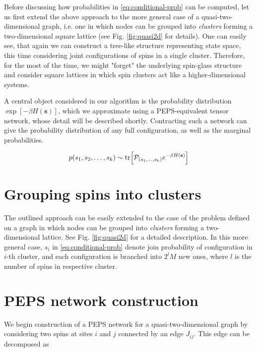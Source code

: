 Before discussing how probabilities in \eqref{eq:conditional-prob} can be computed, let us first extend the above approach to the more general case of a quasi-two-dimensional graph, i.e. one in which nodes can be grouped into \emph{clusters} forming a two-dimensional square lattice (see Fig. \ref{fig:quasi2d} for details). One can easily see, that again we can construct a tree-like structure representing state space, this time considering joint configurations of spins in a single cluster. Therefore, for the most of the time, we might "forget" the underlying spin-glass structure and consider square lattices in which spin clusters act like a higher-dimensional systems.

A central object considered in our algorithm is the probability distribution $\exp[-\beta H(\mathbf{s})]$, which we approximate using a PEPS-equivalent tensor network, whose detail will be described shortly. Contracting such a network can give the probability distribution of any full configuration, as well as the marginal probabilities.

\begin{equation}
    p(s_1, s_2, \ldots, s_k) \sim \tr[\mathcal{P}_{(s_1, \ldots, s_k)} e^{-\beta H(\mathbf{s})}]
\end{equation}

\section{Grouping spins into clusters}
The outlined approach can be easily extended to the case of the problem defined on a graph in which nodes can be grouped into \emph{clusters} forming a two-dimensional lattice. See Fig. \ref{fig:quasi2d} for a detailed description. In this more general case, $s_i$ in \eqref{eq:conditional-prob} denote join probability of configuration in $i$-th cluster, and each configuration is branched into $2^lM$ new ones, where $l$ is the number of spins in respective cluster.

\section{PEPS network construction}
We begin construction of a PEPS network for a quasi-two-dimensional graph by considering two spins at sites $i$ and $j$ connected by an edge $J_{ij}$. This edge can be decomposed as

